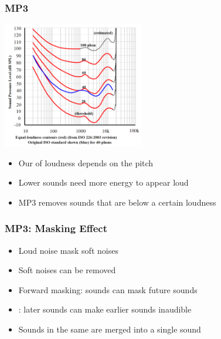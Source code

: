 \begin{frame}
  \frametitle{MP3}
  \begin{center}
    \includegraphics[height=5.5cm]{isophones.png}
  \end{center}
  \begin{itemize}
    \item Our  of loudness depends on the pitch
    \item Lower sounds need more energy to appear loud
    \item MP3 removes sounds that are below a certain loudness
  \end{itemize}
\end{frame}

\begin{frame}
  \frametitle{MP3: Masking Effect}
  \begin{itemize}
    \item Loud noise mask soft noises
    \item Soft noises can be removed
    \item Forward masking: sounds can mask future sounds
    \item {}: later sounds can make earlier sounds inaudible
    \item Sounds in the same  are merged into a single sound
  \end{itemize}
\end{frame}

